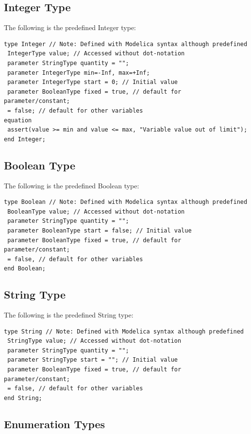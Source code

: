 \documentclass[10pt,a4paper]{report}
\def\doublelabel#1{\label{#1}\hypertarget{#1}{}}
\begin{document}
\subsection{Integer Type}

The following is the predefined Integer type:
\begin{lstlisting}[language=modelica]
type Integer // Note: Defined with Modelica syntax although predefined
 IntegerType value; // Accessed without dot-notation
 parameter StringType quantity = "";
 parameter IntegerType min=-Inf, max=+Inf;
 parameter IntegerType start = 0; // Initial value
 parameter BooleanType fixed = true, // default for parameter/constant;
 = false; // default for other variables
equation
 assert(value >= min and value <= max, "Variable value out of limit");
end Integer;
\end{lstlisting}

\subsection{Boolean Type}

The following is the predefined Boolean type:
\begin{lstlisting}[language=modelica]
type Boolean // Note: Defined with Modelica syntax although predefined
 BooleanType value; // Accessed without dot-notation
 parameter StringType quantity = "";
 parameter BooleanType start = false; // Initial value
 parameter BooleanType fixed = true, // default for parameter/constant;
 = false, // default for other variables
end Boolean;
\end{lstlisting}

\subsection{String Type}

The following is the predefined String type:
\begin{lstlisting}[language=modelica]
type String // Note: Defined with Modelica syntax although predefined
 StringType value; // Accessed without dot-notation
 parameter StringType quantity = "";
 parameter StringType start = ""; // Initial value
 parameter BooleanType fixed = true, // default for parameter/constant;
 = false, // default for other variables
end String;
\end{lstlisting}

\subsection{Enumeration Types}\doublelabel{enumeration-types}
\end{document}
